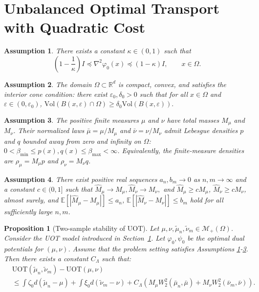 \documentclass[10pt,a4paper]{amsart}
\newtheorem{assumption}{Assumption}
\newtheorem{proposition}{Proposition}
\newcommand{\Ep}{\mathbb{E}}
\renewcommand{\epsilon}{\varepsilon}
\renewcommand{\hat}{\widehat}
\renewcommand{\tilde}{\widetilde}
\begin{document}
\section{Unbalanced Optimal Transport with Quadratic Cost} \label{sec:setup}

\begin{assumption}\label{assm:curvature}
There exists a constant $\kappa \in (0, 1)$ such that 
\[
    \left(1 - \frac{1}{\kappa}\right)I \preceq \nabla^2 \varphi_0(x) \preceq (1 - \kappa)I, \qquad x \in \Omega.
\]
\end{assumption}

\begin{assumption}
\label{assm:supp_global}
The domain $\Omega \subset \mathbb{R}^d$ is compact, convex, and satisfies the interior cone condition: there exist $\epsilon_0, \delta_0 > 0$ such that for all $x \in \Omega$ and $\epsilon \in (0, \epsilon_0)$,
$
    \mathrm{Vol}(B(x,\epsilon) \cap \Omega) \geq \delta_0 \mathrm{Vol}(B(x,\epsilon)).
$
\end{assumption}

\begin{assumption}
\label{assm:positivity}
The positive finite measures $\mu$ and $\nu$ have total masses $M_\mu$ and $M_\nu$. Their normalized laws $\bar\mu=\mu/M_\mu$ and $\bar\nu=\nu/M_\nu$ admit Lebesgue densities $p$ and $q$ bounded away from zero and infinity on $\Omega$: $0<\beta_{\min}\le p(x),q(x)\le\beta_{\max}<\infty$. Equivalently, the finite-measure densities are $\rho_\mu=M_\mu p$ and $\rho_\nu=M_\nu q$.
\end{assumption}

\begin{assumption}\label{assm:masses}
There exist positive real sequences $a_n, b_m \to 0$ as $n,m \to \infty$ and a constant $c\in(0,1]$ such that
$
    \hat M_\mu \to M_\mu,
    \hat M_\nu \to M_\nu,
$ and
$\hat M_\mu \ge c M_\mu$, $\hat M_\nu \ge c M_\nu$, almost surely,
and $\Ep[|\hat M_\mu-M_\mu|] \le a_n$, $\Ep[|\hat M_\nu-M_\nu|] \le b_m$ hold for all sufficiently large $n,m$.
\end{assumption}

\begin{proposition}[Two-sample stability of $\mathrm{UOT}$]
\label{prop:two_sample_stability}
Let $\mu, \nu, \tilde\mu_n, \tilde\nu_m \in \mathcal{M}_+(\Omega)$. {Consider the UOT model introduced in Section~\ref{sec:setup}.} Let $\varphi_0, \psi_0$ be the optimal dual potentials for $(\mu,\nu)$. Assume that the problem setting satisfies Assumptions \ref{assm:curvature}-\ref{assm:positivity}. Then there exists a constant $C_\Lambda$ such that:
\begin{align}
\label{eq:uot_two_sample}
&\mathrm{UOT}(\tilde\mu_n, \tilde\nu_m) - \mathrm{UOT}(\mu, \nu) \\
&\leq \int \zeta_0 d(\tilde\mu_n - \mu) + \int \xi_0 d(\tilde\nu_m - \nu) + C_\Lambda \left( M_\mu W_2^2(\bar\mu_n, \bar\mu) + M_\nu W_2^2(\bar\nu_m, \bar\nu) \right).
\end{align}
\end{proposition}
\end{document}
